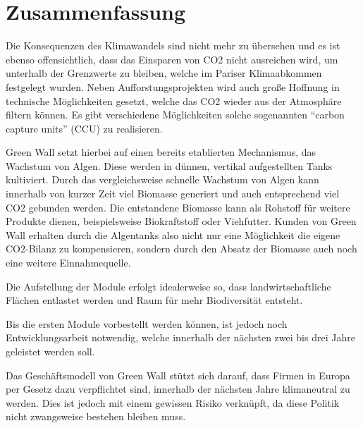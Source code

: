 \chapter{Zusammenfassung}

Die Konsequenzen des Klimawandels sind nicht mehr zu übersehen und es ist ebenso offensichtlich, dass das Einsparen von CO2 nicht ausreichen wird, um unterhalb der Grenzwerte zu bleiben, welche im Pariser Klimaabkommen festgelegt wurden. 
Neben Aufforstungsprojekten wird auch große Hoffnung in technische Möglichkeiten gesetzt, welche das CO2 wieder aus der Atmosphäre filtern können. 
Es gibt verschiedene Möglichkeiten solche sogenannten ``carbon capture units'' (CCU) zu realisieren.

Green Wall setzt hierbei auf einen bereits etablierten Mechanismus, das Wachstum von Algen. 
Diese werden in dünnen, vertikal aufgestellten Tanks kultiviert. 
Durch das vergleichsweise schnelle Wachstum von Algen kann innerhalb von kurzer Zeit viel Biomasse generiert und auch entsprechend viel CO2 gebunden werden. 
Die entstandene Biomasse kann als Rohstoff für weitere Produkte dienen, beispielsweise Biokraftstoff oder Viehfutter. 
Kunden von Green Wall erhalten durch die Algentanks also nicht nur eine Möglichkeit die eigene CO2-Bilanz zu kompensieren, sondern durch den Absatz der Biomasse auch noch eine weitere Einnahmequelle.
 
Die Aufstellung der Module erfolgt idealerweise so, dass landwirtschaftliche Flächen entlastet werden und Raum für mehr Biodiversität entsteht.
 
Bis die ersten Module vorbestellt werden können, ist jedoch noch Entwicklungsarbeit notwendig, welche innerhalb der nächsten zwei bis drei Jahre geleistet werden soll.
 
Das Geschäftsmodell von Green Wall stützt sich darauf, dass Firmen in Europa per Gesetz dazu verpflichtet sind, innerhalb der nächsten Jahre klimaneutral zu werden. Dies ist jedoch mit einem gewissen Risiko verknüpft, da diese Politik nicht zwangsweise bestehen bleiben muss. 
